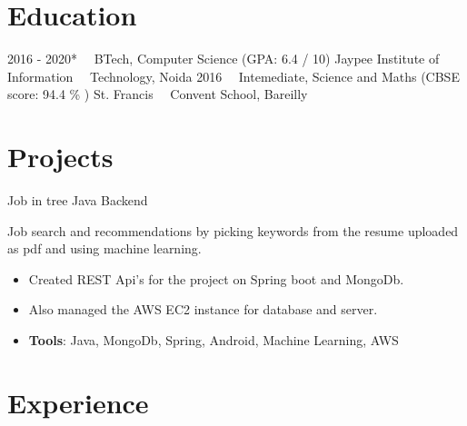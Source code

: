 \documentclass[letterpaper]{twentysecondcv} %
\begin{document}
\makeprofile %

\section{Education}

\begin{twenty} %
	\twentyitem
    	{2016 - 2020*}
        {}
        {~~BTech, Computer Science \textnormal{(GPA: 6.4 / 10)}}
        {{}{Jaypee Institute of Information ~~Technology, Noida}}
        {}
        {}
	\twentyitem
    	{2016}
		{}
        {~~Intemediate, Science and Maths \textnormal{(CBSE score: 94.4 \% )}}
        {St. Francis ~~Convent School, Bareilly }
        {}
        {}
\end{twenty}

\section{Projects}
\begin{twenty}
	\twentyitem
    	{}
		{}
        {Job in tree}
        {{}{Java Backend}}
        {}
        {
       	\textbf{}Job search and recommendations by picking keywords from the resume uploaded as pdf and using machine learning.
        {\begin{itemize}
        \item Created REST Api's for the project on Spring boot and MongoDb.
        \item Also managed the AWS EC2 instance for database and server.
        \item \textbf{Tools}: Java, MongoDb, Spring, Android, Machine Learning, AWS \vspace{2mm}
		\end{itemize}}
        }
\end{twenty}
\vspace{2mm}


\section{Experience}
\end{document}

